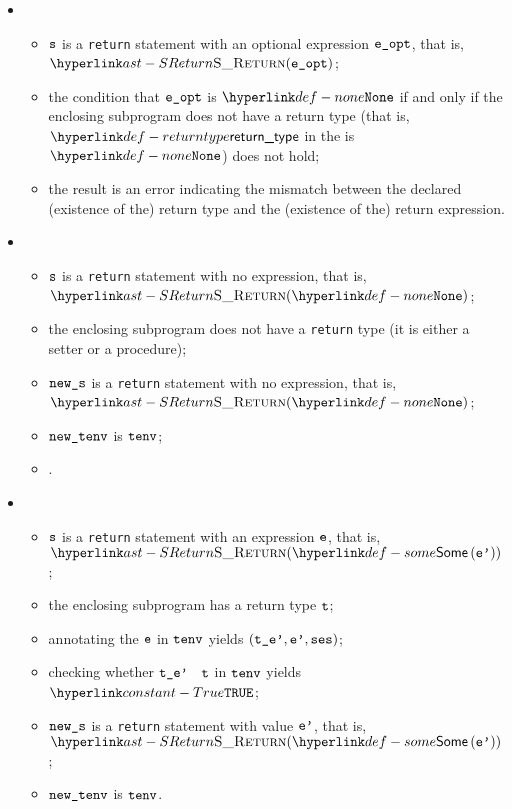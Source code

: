 \ProseParagraph
\OneApplies
\begin{itemize}
  \item {}
  \begin{itemize}
    \item $\vs$ is a \texttt{return} statement with an optional expression $\veopt$, that is, \\
          $\SReturn(\veopt)$;
    \item the condition that $\veopt$ is $\None$ if and only if the enclosing subprogram does not have a return type
          (that is, $\returntype$ in the \localstaticenvironmentterm{} is $\None$) does not hold;
    \item the result is an error indicating the mismatch between the declared (existence of the) return type
          and the (existence of the) return expression.
  \end{itemize}

  \item {}
  \begin{itemize}
    \item $\vs$ is a \texttt{return} statement with no expression, that is, $\SReturn(\None)$;
    \item the enclosing subprogram does not have a \texttt{return} type (it is either a setter
          or a procedure);
    \item $\news$ is a \texttt{return} statement with no expression, that is, $\SReturn(\None)$;
    \item $\newtenv$ is $\tenv$;
    \item {}.
  \end{itemize}

  \item {}
  \begin{itemize}
    \item $\vs$ is a \texttt{return} statement with an expression $\ve$, that is, $\SReturn(\some{ \vep })$;
    \item the enclosing subprogram has a return type $\vt$;
    \item annotating the \rhsexpression{} $\ve$ in $\tenv$ yields $(\tep,\vep,\vses)$\ProseOrTypeError;
    \item checking whether $\vtep$ \typesatisfiesterm\ $\vt$ in $\tenv$ yields $\True$\ProseOrTypeError;
    \item $\news$ is a \texttt{return} statement with value $\vep$, that is, $\SReturn(\some{ \vep })$;
    \item $\newtenv$ is $\tenv$.
  \end{itemize}
\end{itemize}
\FormallyParagraph
\begin{mathpar}
\end{mathpar}

